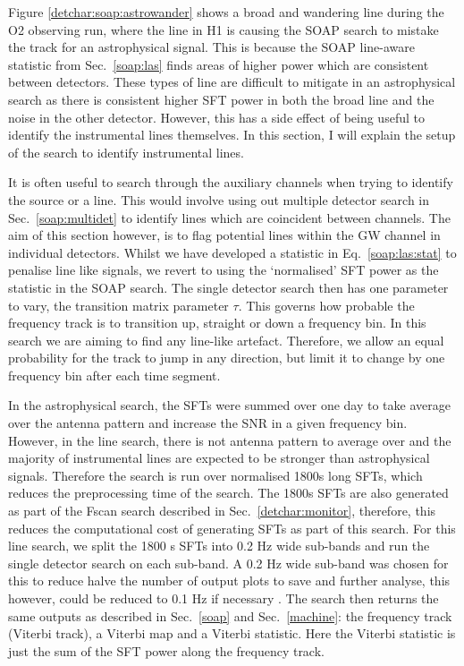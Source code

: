 %
Figure \ref{detchar:soap:astrowander} shows a broad and wandering line during the O2 observing run, where the line in H1 is causing the SOAP search to mistake the track for an astrophysical signal.
This is because the SOAP line-aware statistic from Sec.~\ref{soap:las} finds
areas of higher power which are consistent between detectors. These types of line are difficult to mitigate in an astrophysical
search as there is consistent higher \gls{SFT} power in both the broad line and the noise in the other detector.
However, this has a side effect of being useful to identify the
instrumental lines themselves.
In this section, I will explain the setup of the search to identify
instrumental lines.

It is often useful to search through the auxiliary channels when trying to
identify the source or a line. 
This would involve using out multiple detector search in Sec.~\ref{soap:multidet} to identify lines which are coincident between channels. 
The aim of this section however, is to flag potential lines within the \gls{GW} channel in individual detectors.
Whilst we have developed a statistic in Eq.~\ref{soap:las:stat} to penalise line like signals, we revert to using the
`normalised' \gls{SFT} power as the statistic in the SOAP search. The single
detector search then has one parameter to vary, the transition matrix
parameter $\tau$.  This governs how probable the frequency track is to transition up,
straight or down a frequency bin.  In this search we are aiming to find any line-like artefact.
Therefore, we allow an equal probability for the track to jump in any
direction, but limit it to change by one frequency bin after each time
segment.  

In the astrophysical search, the \glspl{SFT} were summed over one day to take average over the antenna pattern and increase the \gls{SNR} in a given frequency bin.
However, in the line search, there is not antenna pattern to average over and the majority of instrumental lines are expected to be stronger than astrophysical signals.
Therefore the search is run over normalised 1800s long \glspl{SFT}, which reduces the preprocessing time of the search.
The 1800s \glspl{SFT} are also generated as part of the Fscan search described in Sec.~\ref{detchar:monitor}, therefore, this reduces the computational cost of generating \glspl{SFT} as part of this search. 
For this line search, we split the 1800 s \glspl{SFT} into 0.2 Hz  wide sub-bands and run the single detector search on each sub-band. 
A 0.2 Hz wide sub-band was chosen for this to reduce halve the number of output plots to save and further analyse, this however, could be reduced to 0.1 Hz if necessary .  The search then returns the same outputs as described in
Sec.~\ref{soap} and Sec.~\ref{machine}: the frequency track (Viterbi track), a
Viterbi map and a Viterbi statistic.  Here the Viterbi statistic is just the
sum of the \gls{SFT} power along the frequency track.  

